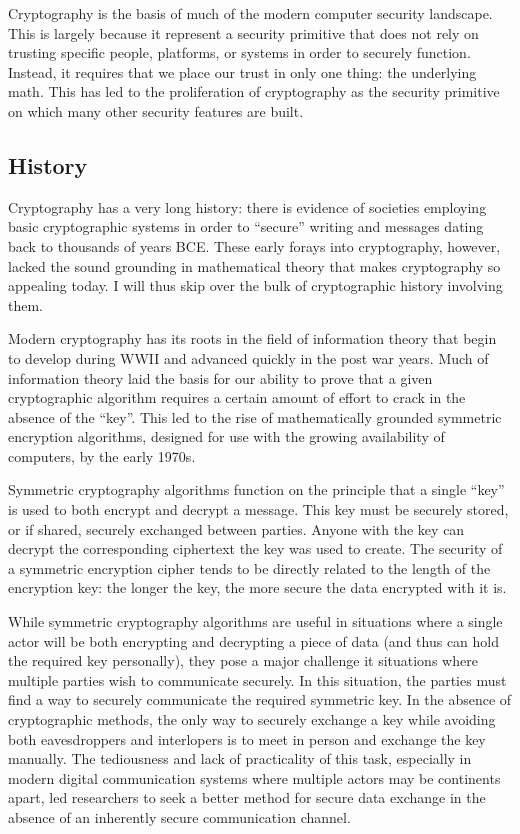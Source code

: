 \documentclass{sig-alternate}
\begin{document}
Cryptography is the basis of much of the modern computer security
landscape. This is largely because it represent a security primitive
that does not rely on trusting specific people, platforms, or systems
in order to securely function. Instead, it requires that we place our
trust in only one thing: the underlying math. This has led to the
proliferation of cryptography as the security primitive on which many
other security features are built.

\subsection{History}

Cryptography has a very long history: there is evidence of societies
employing basic cryptographic systems in order to ``secure'' writing
and messages dating back to thousands of years BCE. These early forays
into cryptography, however, lacked the sound grounding in mathematical
theory that makes cryptography so appealing today. I will thus skip
over the bulk of cryptographic history involving them.

Modern cryptography has its roots in the field of information theory
that begin to develop during WWII and advanced quickly in the post war
years. Much of information theory laid the basis for our ability to
prove that a given cryptographic algorithm requires a certain amount
of effort to crack in the absence of the ``key''. This led to the rise
of mathematically grounded symmetric encryption algorithms, designed
for use with the growing availability of computers, by the early
1970s.

Symmetric cryptography algorithms function on the principle that a
single ``key'' is used to both encrypt and decrypt a message. This key
must be securely stored, or if shared, securely exchanged between
parties. Anyone with the key can decrypt the corresponding ciphertext
the key was used to create. The security of a symmetric encryption
cipher tends to be directly related to the length of the encryption
key: the longer the key, the more secure the data encrypted with it
is.

While symmetric cryptography algorithms are useful in situations where
a single actor will be both encrypting and decrypting a piece of data
(and thus can hold the required key personally), they pose a major
challenge it situations where multiple parties wish to communicate
securely. In this situation, the parties must find a way to securely
communicate the required symmetric key. In the absence of
cryptographic methods, the only way to securely exchange a key while
avoiding both eavesdroppers and interlopers is to meet in person and
exchange the key manually. The tediousness and lack of practicality of
this task, especially in modern digital communication systems where
multiple actors may be continents apart, led researchers to seek a
better method for secure data exchange in the absence of an inherently
secure communication channel.
\end{document}
